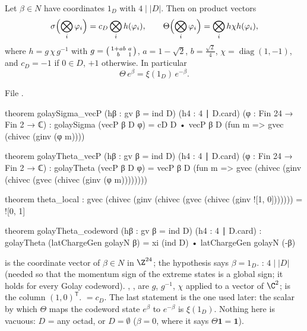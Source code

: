 \begin{theorem}\label{ch13:thm:cube}
Let $\beta\in N$ have coordinates $1_D$ with $4\mid|D|$. Then on product vectors
\begin{equation*}
  \sigma\Bigl(\bigotimes_i\varphi_i\Bigr)=c_D\bigotimes_i h(\varphi_i),\qquad
  \Theta\Bigl(\bigotimes_i\varphi_i\Bigr)=\bigotimes_i h\chi h(\varphi_i),
\end{equation*}
where $h=g\,\chi\,g^{-1}$ with $g=\begin{psmallmatrix}1+ab&a\\ b&1\end{psmallmatrix}$, $a=1-\sqrt2$, $b=\tfrac{\sqrt2}{4}$,
$\chi=\operatorname{diag}(1,-1)$, and $c_D=-1$ if $0\in D$, $+1$ otherwise. In particular
\begin{equation*}
  \Theta\,e^{\beta}=\xi(1_D)\,e^{-\beta}.
\end{equation*}
\end{theorem}
\noindent File .
\begin{leancode}
theorem golaySigma_vecP (hβ : gv β = ind D) (h4 : 4 ∣ D.card) (φ : Fin 24 → Fin 2 → ℂ) :
    golaySigma (vecP β D φ) = cD D • vecP β D (fun m => gvec (chivec (ginv (φ m))))

theorem golayTheta_vecP (hβ : gv β = ind D) (h4 : 4 ∣ D.card) (φ : Fin 24 → Fin 2 → ℂ) :
    golayTheta (vecP β D φ) = vecP β D (fun m =>
      gvec (chivec (ginv (chivec (gvec (chivec (ginv (φ m))))))))

theorem theta_local :
    gvec (chivec (ginv (chivec (gvec (chivec (ginv ![1, 0])))))) = ![0, 1]

theorem golayTheta_codeword (hβ : gv β = ind D) (h4 : 4 ∣ D.card) :
    golayTheta (latChargeGen golayN β) = xi (ind D) • latChargeGen golayN (-β)
\end{leancode}
\begin{dictionary}
 is the coordinate vector of $\beta\in N$ in $\Z^{24}$; the hypothesis  says
$\beta=1_D$. : $4\mid|D|$ (needed so that the momentum sign of the extreme states is a global sign;
it holds for every Golay codeword). , ,  are $g$, $g^{-1}$, $\chi$ applied to a
vector of $\C^2$; \lean{![1, 0]} is the column $(1,0)^{\mathsf T}$.  $=c_D$. The last statement is the
one used later: the scalar by which $\Theta$ maps the codeword state $e^\beta$ to $e^{-\beta}$ is $\xi(1_D)$.
Nothing here is vacuous: $D$ = any octad, or $D=\emptyset$ ($\beta=0$, where it says $\Theta\mathbf 1=\mathbf 1$).
\end{dictionary}
